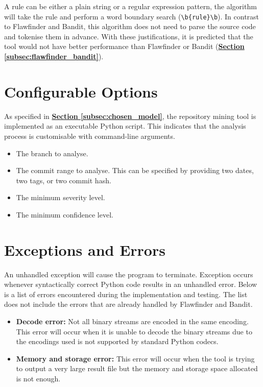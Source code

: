 \documentclass[12pt, a4paper]{report}
\begin{document}
A rule can be either a plain string or a regular expression pattern, the algorithm will take the
rule and perform a word boundary search (\verb|\b{rule}\b|). In contrast to Flawfinder and Bandit,
this algorithm does not need to parse the source code and tokenise them in advance. With these
justifications, it is predicted that the tool would not have better performance than Flawfinder or
Bandit (\hyperref[subsec:flawfinder_bandit]{\textbf{Section \ref*{subsec:flawfinder_bandit}}}).

\section{Configurable Options}
As specified in \hyperref[subsec:chosen_model]{\textbf{Section \ref*{subsec:chosen_model}}}, the
repository mining tool is implemented as an executable Python script. This indicates that the
analysis process is customisable with command-line arguments.

\begin{itemize}
  \item The branch to analyse.
  \item The commit range to analyse. This can be specified by providing two dates, two tags, or two
  commit hash.
  \item The minimum severity level.
  \item The minimum confidence level.
\end{itemize}

\section{Exceptions and Errors}
An unhandled exception will cause the program to terminate. Exception occurs whenever syntactically
correct Python code results in an unhandled error. Below is a list of errors encountered during the
implementation and testing. The list does not include the errors that are already handled by
Flawfinder and Bandit.
\begin{itemize}
  \item \textbf{Decode error:} Not all binary streams are encoded in the same encoding. This error
  will occur when it is unable to decode the binary streams due to the encodings used is not
  supported by standard Python codecs.
  \item \textbf{Memory and storage error:} This error will occur when the tool is trying to output a
  very large result file but the memory and storage space allocated is not enough.
\end{itemize}
\end{document}
